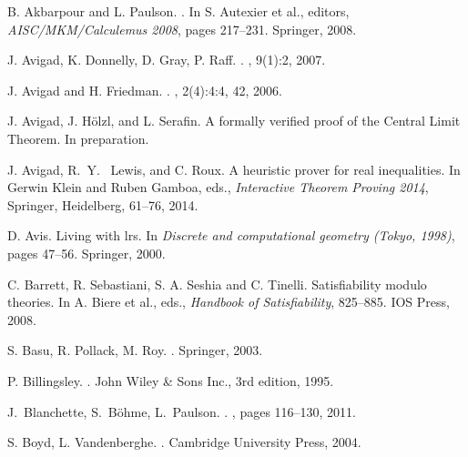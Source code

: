 \documentclass[runningheds]{llncs}
\begin{document}
\def\cprime{$'$}
\begin{thebibliography}{10}

B. Akbarpour and L. Paulson.
.
\newblock In S. Autexier et al., editors, {\em {AISC/MKM/Calculemus 2008}}, pages 217--231. Springer, 2008.

J. Avigad, K. Donnelly, D. Gray,  P. Raff.
.
, 9(1):2, 2007.



J. Avigad and H. Friedman.
.
, 2(4):4:4, 42, 2006.

J. Avigad, J. H\"olzl, and L. Serafin.
\newblock A formally verified proof of the Central Limit Theorem.
\newblock In preparation.

J. Avigad, R.~Y.~ Lewis, and C. Roux.
\newblock A heuristic prover for real inequalities.
\newblock  In Gerwin Klein and Ruben Gamboa, eds., {\em Interactive Theorem Proving 2014}, Springer, Heidelberg, 61--76, 2014. 

D. Avis.
\newblock Living with lrs.
\newblock In {\em Discrete and computational geometry ({T}okyo, 1998)}, pages 47--56. Springer, 
  2000.

C. Barrett, R. Sebastiani, S. A. Seshia and C. Tinelli.
\newblock Satisﬁability modulo theories.
\newblock In A. Biere et al., eds., {\em Handbook of Satisﬁability}, 825--885. IOS Press, 2008.

S. Basu, R. Pollack,  M. Roy.
.
\newblock Springer, 2003.

P. Billingsley.
.
\newblock John Wiley \& Sons Inc., 3rd edition, 1995.

J.~Blanchette, S.~B\"{o}hme,  L.~Paulson.
.
, pages 116--130, 2011.

S.\! Boyd, L.\! Vandenberghe.
.
\newblock Cambridge University Press, 2004.


\end{thebibliography}
\end{document}
